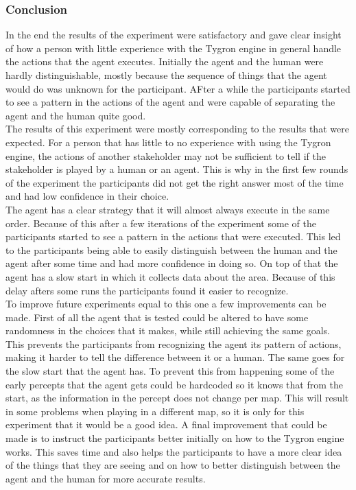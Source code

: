 \documentclass[11pt,a4paper]{article}
\begin{document}
\subsubsection{Conclusion}
In the end the results of the experiment were satisfactory and gave clear insight of how a person with little experience with the Tygron engine in general handle the actions that the agent executes. Initially the agent and the human were hardly distinguishable, mostly because the sequence of things that the agent would do was unknown for the participant. AFter a while the participants started to see a pattern in the actions of the agent and were capable of separating the agent and the human quite good.\\
The results of this experiment were mostly corresponding to the results that were expected. For a person that has little to no experience with using the Tygron engine, the actions of another stakeholder may not be sufficient to tell if the stakeholder is played by a human or an agent. This is why in the first few rounds of the experiment the participants did not get the right answer most of the time and had low confidence in their choice. \\ The agent has a clear strategy that it will almost always execute in the same order. Because of this after a few iterations of the experiment some of the participants started to see a pattern in the actions that were executed. This led to the participants being able to easily distinguish between the human and the agent after some time and had more confidence in doing so. On top of that the agent has a slow start in which it collects data about the area. Because of this delay afters some runs the participants found it easier to recognize. \\
To improve future experiments equal to this one a few improvements can be made. First of all the agent that is tested could be altered to have some randomness in the choices that it makes, while still achieving the same goals. This prevents the participants from recognizing the agent its pattern of actions, making it harder to tell the difference between it or a human. The same goes for the slow start that the agent has. To prevent this from happening some of the early percepts that the agent gets could be hardcoded so it knows that from the start, as the information in the percept does not change per map. This will result in some problems when playing in a different map, so it is only for this experiment that it would be a good idea. A final improvement that could be made is to instruct the participants better initially on how to the Tygron engine works. This saves time and also helps the participants to have a more clear idea of the things that they are seeing and on how to better distinguish between the agent and the human for more accurate results.
\end{document}
